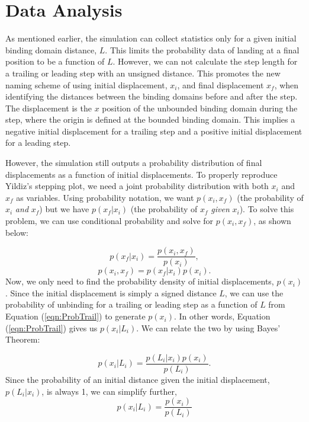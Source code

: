 \section{Data Analysis} \label{sec:DataAna}
As mentioned earlier, the simulation can collect statistics only for a given initial binding domain distance, $L$. This limits the probability data of landing at a final position to be a function of $L$. However, we can not calculate the step length for a trailing or leading step with an unsigned distance. This promotes the new naming scheme of using initial displacement, $x_i$, and final displacement $x_f$, when identifying the distances between the binding domains before and after the step. The displacement is the $x$ position of the unbounded binding domain during the step, where the origin is defined at the bounded binding domain. This implies a negative initial displacement for a trailing step and a positive initial displacement for a leading step. 

However, the simulation still outputs a probability distribution of final displacements as a function of initial displacements. To properly reproduce Yildiz's stepping plot, we need a joint probability distribution with both $x_i$ and $x_f$ as variables. Using probability notation, we want $p(x_i,x_f)$ (the probability of $x_i$ \textit{and} $x_f$) but we have $p(x_f|x_i)$ (the probability of $x_f$ \textit{given} $x_i$). To solve this problem, we can use conditional probability and solve for $p(x_i,x_f)$, as shown below:


\[
	p(x_f|x_i)=\frac{p(x_i,x_f)}{p(x_i)},
\]
\begin{equation}
	p(x_i,x_f)=p(x_f|x_i)p(x_i).
\end{equation}
Now, we only need to find the probability density of initial displacements, $p(x_i)$. Since the initial displacement is simply a signed distance $L$, we can use the probability of unbinding for a trailing or leading step as a function of $L$ from Equation (\ref{eqn:ProbTrail}) to generate $p(x_i)$. In other words, Equation (\ref{eqn:ProbTrail}) gives us $p(x_i|L_i)$. We can relate the two by using Bayes' Theorem:

\begin{equation}
	p(x_i|L_i)=\frac{p(L_i|x_i)p(x_i)}{p(L_i)}.
\end{equation}
Since the probability of an initial distance given the initial displacement, $p(L_i|x_i)$, is always 1, we can simplify further,
\[
	p(x_i|L_i)=\frac{p(x_i)}{p(L_i)} 
\]

